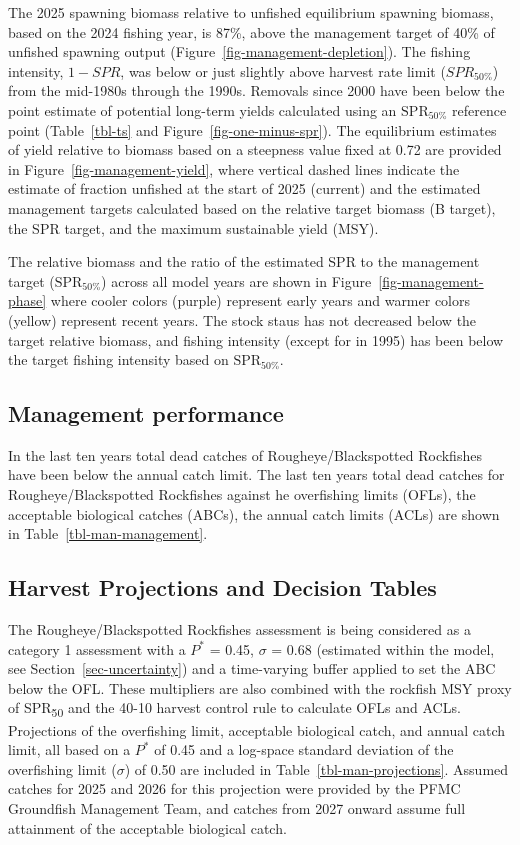 \documentclass[
]{scrartcl}
\begin{document}
The 2025 spawning biomass relative to unfished equilibrium spawning
biomass, based on the 2024 fishing year, is 87\%, above the management
target of 40\% of unfished spawning output
(Figure~\ref{fig-management-depletion}). The fishing intensity,
\(1-SPR\), was below or just slightly above harvest rate limit
(\(SPR_{50\%}\)) from the mid-1980s through the 1990s. Removals since
2000 have been below the point estimate of potential long-term yields
calculated using an \(\text{SPR}_{50\%}\) reference point
(Table~\ref{tbl-ts} and Figure~\ref{fig-one-minus-spr}). The equilibrium
estimates of yield relative to biomass based on a steepness value fixed
at 0.72 are provided in Figure~\ref{fig-management-yield}, where
vertical dashed lines indicate the estimate of fraction unfished at the
start of 2025 (current) and the estimated management targets calculated
based on the relative target biomass (B target), the SPR target, and the
maximum sustainable yield (MSY).

The relative biomass and the ratio of the estimated SPR to the
management target (\(\text{SPR}_{50\%}\)) across all model years are
shown in Figure~\ref{fig-management-phase} where cooler colors (purple)
represent early years and warmer colors (yellow) represent recent years.
The stock staus has not decreased below the target relative biomass, and
fishing intensity (except for in 1995) has been below the target fishing
intensity based on \(\text{SPR}_{50\%}\).

\subsection{Management performance}\label{management-performance-1}

In the last ten years total dead catches of Rougheye/Blackspotted
Rockfishes have been below the annual catch limit. The last ten years
total dead catches for Rougheye/Blackspotted Rockfishes against he
overfishing limits (OFLs), the acceptable biological catches (ABCs), the
annual catch limits (ACLs) are shown in Table~\ref{tbl-man-management}.

\subsection{Harvest Projections and Decision
Tables}\label{harvest-projections-and-decision-tables-1}

The Rougheye/Blackspotted Rockfishes assessment is being considered as a
category 1 assessment with a \(P^*\) = 0.45, \(\sigma\) = 0.68
(estimated within the model, see Section~\ref{sec-uncertainty}) and a
time-varying buffer applied to set the ABC below the OFL. These
multipliers are also combined with the rockfish MSY proxy of
SPR\textsubscript{50} and the 40-10 harvest control rule to calculate
OFLs and ACLs. Projections of the overfishing limit, acceptable
biological catch, and annual catch limit, all based on a \(P^*\) of 0.45
and a log-space standard deviation of the overfishing limit (\(\sigma\))
of 0.50 are included in Table~\ref{tbl-man-projections}. Assumed catches
for 2025 and 2026 for this projection were provided by the PFMC
Groundfish Management Team, and catches from 2027 onward assume full
attainment of the acceptable biological catch.
\end{document}
